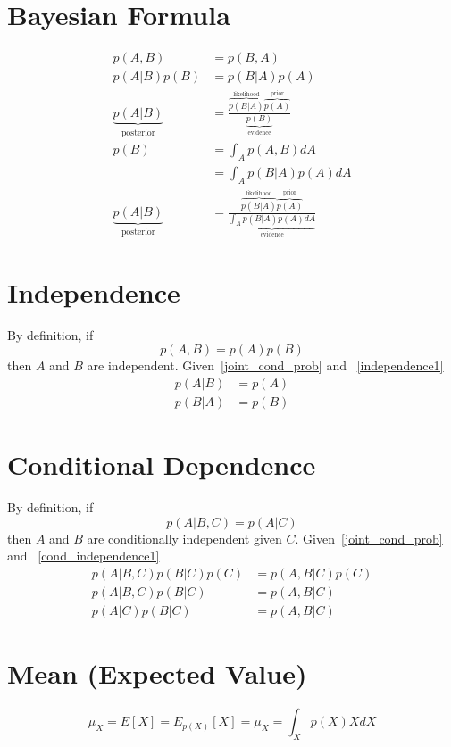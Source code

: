 \documentclass{book}
\numberwithin{equation}{subsection}
\begin{document}
\section{Bayesian Formula}
\begin{align}
    p(A,B) &= p(B,A)\\
    p(A|B)p(B) &= p(B|A)p(A)\\
    \underbrace{p(A|B)}_{\text{posterior}} &= \frac{\overbrace{p(B|A)}^\text{likelihood}\overbrace{p(A)}^\text{prior}}{\underbrace{p(B)}_\text{evidence}}\\
    p(B) &= \int_A p(A,B)dA\\
    &= \int_A p(B|A)p(A)dA\\
    \underbrace{p(A|B)}_{\text{posterior}} &= \frac{\overbrace{p(B|A)}^\text{likelihood}\overbrace{p(A)}^\text{prior}}{\underbrace{\int_A p(B|A)p(A)dA}_\text{evidence}}\label{bayesian}
\end{align}
\section{Independence}
By definition, if
\begin{equation}
    p(A,B) = p(A)p(B) \label{independence1}
\end{equation}
then $A$ and $B$ are independent. Given~\ref{joint_cond_prob} and ~\ref{independence1}
\begin{align}
    p(A|B) &= p(A)\\
    p(B|A) &= p(B) \label{independence2}
\end{align}
\section{Conditional Dependence}
By definition, if
\begin{equation}
    p(A|B,C) = p(A|C) \label{cond_independence1}
\end{equation}
then $A$ and $B$ are conditionally independent given $C$.
Given~\ref{joint_cond_prob} and ~\ref{cond_independence1}
\begin{align}
    p(A|B,C)p(B|C)p(C) &= p(A,B|C)p(C)\\
    p(A|B,C)p(B|C) &= p(A,B|C)\\
    p(A|C)p(B|C) &= p(A,B|C) \label{cond_independence2}
\end{align}
\section{Mean (Expected Value)}
\begin{equation}
    \mu_X = E[X] = E_{p(X)}[X] = \mu_X = \int_X p(X)X dX
\end{equation}
\end{document}
